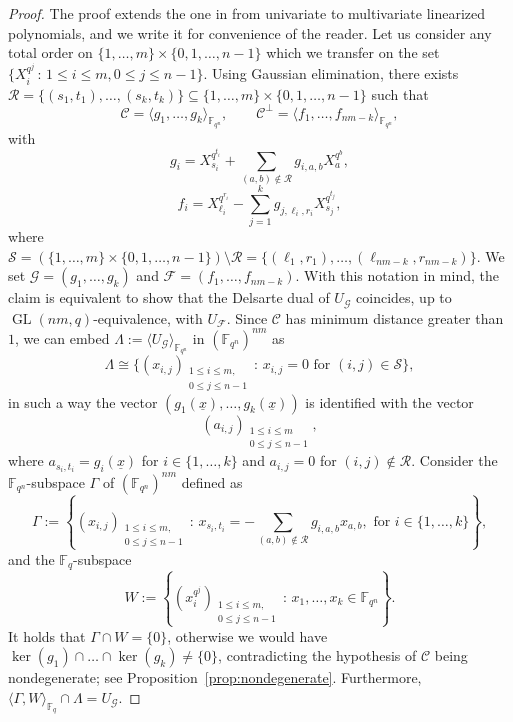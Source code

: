 \documentclass[11pt]{article}
\theoremstyle{definition}
\numberwithin{equation}{section}
\DeclareMathOperator{\GL}{GL}
\begin{document}
\begin{proof}
The proof extends the one in \cite[Theorem 4.12]{csajbok2021generalising} from univariate to multivariate linearized polynomials, and we write it for convenience of the reader.
    Let us consider any total order on $\{1,\ldots,m\}\times \{0,1,\ldots,n-1\}$ which we transfer on the set $\{X_i^{q^{j}} \,:\, 1\leq i \leq m, 0 \leq j \leq n-1\}$. Using Gaussian elimination, there exists $\mathcal R=\{(s_1,t_1),\ldots,(s_k,t_k)\}\subseteq\{1,\ldots,m\}\times \{0,1,\ldots,n-1\}$  such that
    $$\mathcal{C}=\langle g_1,\ldots,g_k\rangle_{{\mathbb F}_{q^n}}, \qquad \mathcal{C}^\perp=\langle f_1,\ldots,f_{nm-k}\rangle_{{\mathbb F}_{q^n}},$$
    with 
    $$g_i=X_{s_i}^{q^{t_i}}+\sum_{(a,b)\notin \mathcal R}g_{i,a,b}X_a^{q^b},$$
    $$f_i=X_{\ell_i}^{q^{r_i}}-\sum_{j=1}^kg_{j,\ell_i,r_i}X_{s_j}^{q^{t_j}},$$
    where $\mathcal S=(\{1,\ldots,m\}\times \{0,1,\ldots,n-1\})\setminus \mathcal R=\{(\ell_1,r_1),\ldots,(\ell_{nm-k},r_{nm-k})\}$. We set $\mathcal G=(g_1,\ldots,g_k)$ and $\mathcal F=(f_1,\ldots,f_{nm-k})$. With this notation in mind, the claim is equivalent to show that the Delsarte dual of $U_{\mathcal G}$ coincides, up to $\GL(nm,q)$-equivalence, with $U_{\mathcal F}$. 
    Since $\mathcal{C}$ has minimum distance greater than $1$, we can embed $\Lambda:=\langle U_{\mathcal G}\rangle_{{\mathbb F}_{q^n}}$ in $(\mathbb{F}_{q^n})^{nm}$ as 
    $$\Lambda \cong \{(x_{i,j})_{\substack{1\leq i \leq m,\\ 0 \leq j \leq n-1}} \,:\, x_{i,j}=0 \mbox{ for } (i,j) \in \mathcal S\},$$
    in such a way the vector $(g_1(\underline{x}),\ldots,g_k(\underline{x}))$ is identified with the vector
    $$(a_{i,j})_{\substack{1\leq i \leq m\\  0 \leq j \leq n-1}},$$
    where $a_{s_i,t_i}=g_i(\underline{x})$ for $i\in\{1,\ldots,k\}$ and $a_{i,j}=0$ for $(i,j)\notin \mathcal R$. Consider the ${\mathbb F}_{q^n}$-subspace $\Gamma$ of $(\mathbb{F}_{q^n})^{nm}$ defined as
    $$\Gamma:= \left\{  (x_{i,j})_{\substack{1\leq i \leq m,\\  0 \leq j \leq n-1}}  \,:\, x_{s_i,t_i}=-\sum_{(a,b)\notin \mathcal R}g_{i,a,b}x_{a,b}, \mbox{ for } i\in\{1,\ldots,k\} \right\},$$
    and the $\mathbb{F}_q$-subspace 
    $$W:= \left\{  \left(x_{i}^{q^j}\right)_{\substack{1\leq i \leq m,\\  0 \leq j \leq n-1}}  \,:\, x_1,\ldots,x_k\in{\mathbb F}_{q^n}\right\}.$$
    It holds that $\Gamma\cap W=\{0\}$, otherwise we would have $\ker(g_1)\cap\ldots\cap\ker(g_k)\neq\{0\}$, contradicting the hypothesis of $\mathcal{C}$ being nondegenerate; see Proposition~\ref{prop:nondegenerate}. Furthermore, $\langle \Gamma, W\rangle_{\mathbb{F}_q}\cap\Lambda=U_{\mathcal G}$.

\end{proof}
\end{document}
